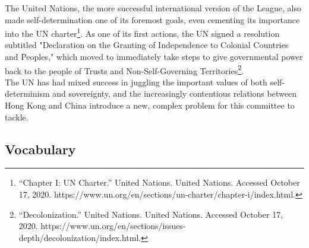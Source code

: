 \documentclass[10pt, letterpaper]{article}
\begin{document}
The United Nations, the more successful international version of the
League, also made self-determination one of its foremost goals, even
cementing its importance into the UN charter\footnote{``Chapter I: UN
  Charter.'' United Nations. United Nations. Accessed October 17, 2020.
  https://www.un.org/en/sections/un-charter/chapter-i/index.html.}. As
one of its first actions, the UN signed a resolution subtitled
"Declaration on the Granting of Independence to Colonial Countries and
Peoples," which moved to immediately take steps to give governmental
power back to the people of Trusts and Non-Self-Governing
Territories\footnote{``Decolonization.'' United Nations. United Nations.
  Accessed October 17, 2020.
  https://www.un.org/en/sections/issues-depth/decolonization/index.html.}.\\


The UN has had mixed success in juggling the important values of both
self-determinism and sovereignty, and the increasingly contentious
relations between Hong Kong and China introduce a new, complex problem
for this committee to tackle.
\newpage
\subsection{Vocabulary}
\end{document}
